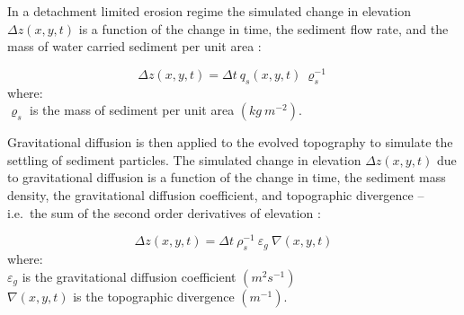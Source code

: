 \documentclass[final,3p,times,twocolumn]{elsarticle}
\begin{document}
In a detachment limited erosion regime
the simulated change in elevation $\Delta z(x,y,t)$
is a function of
the change in time, the sediment flow rate, and the mass of water carried sediment per unit area
\cite{Mitasova2013}:

\begin{equation}
\label{eq:flux_evolution} 
{\Delta z(x,y,t) = \Delta t ~ q_s(x,y,t) ~ \varrho_s^{-1} } 
\end{equation}
%
{\small
\noindent
where: \\
\noindent
\hspace*{0.5em} $\varrho_s$ is the mass of sediment per unit area $(kg ~ m^{-2})$.\\
}

\noindent
Gravitational diffusion is then applied to the evolved topography
to simulate the settling of sediment particles. 
The simulated change in elevation $\Delta z(x,y,t) $ due to gravitational diffusion 
is a function of the change in time, the sediment mass density, 
the gravitational diffusion coefficient, and topographic divergence 
-- i.e.~the sum of the second order derivatives of elevation
\cite{thaxton2004}:

\begin{equation}
\label{eq:grav_diffusion} 
{\Delta z(x,y,t) = \Delta t ~ \rho_s^{-1} ~ \varepsilon_g ~ \nabla(x,y,t)}
\end{equation}
%
{\small
\noindent
where: \\
\noindent
\hspace*{0.5em} $\varepsilon_g$ is the gravitational diffusion coefficient $(m^{2} s^{-1})$\\ %
\hspace*{0.5em} $\nabla(x,y,t)$ is the topographic divergence $(m^{-1})$.\\
}
\end{document}

